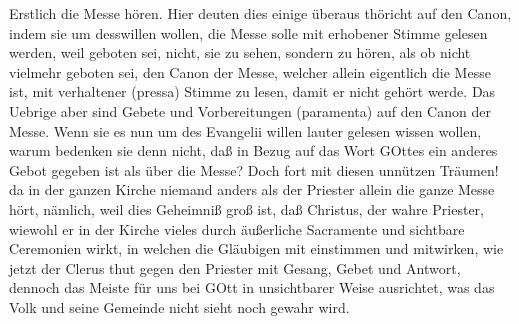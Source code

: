 Erstlich die Messe hören. Hier deuten dies einige überaus thöricht auf den Canon, indem sie um desswillen wollen, die Messe solle mit erhobener Stimme gelesen werden, weil geboten sei, nicht, sie zu sehen, sondern zu hören, als ob nicht vielmehr geboten sei, den Canon der Messe, welcher allein eigentlich die Messe ist, mit verhaltener (pressa) Stimme zu lesen, damit er nicht gehört werde. Das Uebrige aber sind Gebete und Vorbereitungen (paramenta) auf den Canon der Messe. Wenn sie es nun um des Evangelii willen lauter gelesen wissen wollen, warum bedenken sie denn nicht, daß in Bezug auf das Wort GOttes ein anderes Gebot gegeben ist als über die Messe? Doch fort mit diesen unnützen Träumen! da in der ganzen Kirche niemand anders als der Priester allein die ganze Messe hört, nämlich, weil dies Geheimniß groß ist, daß Christus, der wahre Priester, wiewohl er in der Kirche vieles durch äußerliche Sacramente und sichtbare Ceremonien wirkt, in welchen die Gläubigen mit einstimmen und mitwirken, wie jetzt der Clerus thut gegen den Priester mit Gesang, Gebet und Antwort, dennoch das Meiste für uns bei GOtt in unsichtbarer Weise ausrichtet, was das Volk und seine Gemeinde nicht sieht noch gewahr wird.

